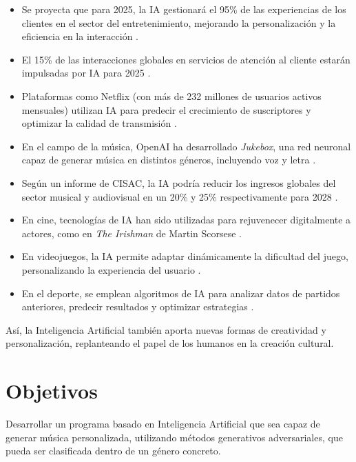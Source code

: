 \begin{itemize}
    \item Se proyecta que para 2025, la IA gestionará el 95\% de las experiencias de los clientes en el sector del entretenimiento, mejorando la personalización y la eficiencia en la interacción \cite{marketers}.
    
    \item El 15\% de las interacciones globales en servicios de atención al cliente estarán impulsadas por IA para 2025 \cite{marketers}.
    
    \item Plataformas como Netflix (con más de 232 millones de usuarios activos mensuales) utilizan IA para predecir el crecimiento de suscriptores y optimizar la calidad de transmisión \cite{marketers}.
    
    \item En el campo de la música, OpenAI ha desarrollado \textit{Jukebox}, una red neuronal capaz de generar música en distintos géneros, incluyendo voz y letra \cite{jukebox}.
    
    \item Según un informe de CISAC, la IA podría reducir los ingresos globales del sector musical y audiovisual en un 20\% y 25\% respectivamente para 2028 \cite{elpais}.
    
    \item En cine, tecnologías de IA han sido utilizadas para rejuvenecer digitalmente a actores, como en \textit{The Irishman} de Martin Scorsese \cite{linkedin}.
    
    \item En videojuegos, la IA permite adaptar dinámicamente la dificultad del juego, personalizando la experiencia del usuario \cite{iaespana}.
    
    \item En el deporte, se emplean algoritmos de IA para analizar datos de partidos anteriores, predecir resultados y optimizar estrategias \cite{learningheroes}.
\end{itemize}

Así, la Inteligencia Artificial también aporta nuevas formas de creatividad y personalización, replanteando el papel de los humanos en la creación cultural.

\section{Objetivos}
\label{objetivo-principal}
Desarrollar un programa basado en Inteligencia Artificial que sea capaz de generar música personalizada, utilizando métodos generativos adversariales, que pueda ser clasificada dentro de un género concreto.


